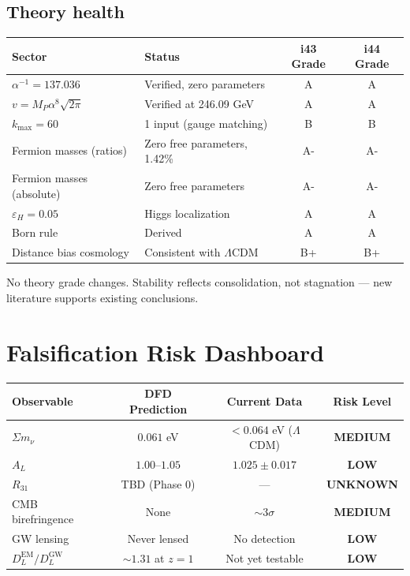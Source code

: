 \documentclass[11pt,a4paper]{article}
\begin{document}
\subsection{Theory health}

\begin{center}
\begin{tabular}{llcc}
\toprule
\textbf{Sector} & \textbf{Status} & \textbf{i43 Grade} & \textbf{i44 Grade} \\
\midrule
$\alpha^{-1} = 137.036$ & Verified, zero parameters & A & A \\
$v = M_P \alpha^8 \sqrt{2\pi}$ & Verified at 246.09 GeV & A & A \\
$k_{\max} = 60$ & 1 input (gauge matching) & B & B \\
Fermion masses (ratios) & Zero free parameters, 1.42\% & A- & A- \\
Fermion masses (absolute) & Zero free parameters & A- & A- \\
$\varepsilon_H = 0.05$ & Higgs localization & A & A \\
Born rule & Derived & A & A \\
Distance bias cosmology & Consistent with $\Lambda$CDM & B+ & B+ \\
\bottomrule
\end{tabular}
\end{center}

No theory grade changes. Stability reflects consolidation, not stagnation --- new literature supports existing conclusions.

\section{Falsification Risk Dashboard}

\begin{center}
\begin{tabular}{lccc}
\toprule
\textbf{Observable} & \textbf{DFD Prediction} & \textbf{Current Data} & \textbf{Risk Level} \\
\midrule
$\Sigma m_\nu$ & $0.061$ eV & $< 0.064$ eV ($\Lambda$CDM) & \textcolor{dfdyellow}{\textbf{MEDIUM}} \\
$A_L$ & $1.00$--$1.05$ & $1.025 \pm 0.017$ & \textcolor{dfdgreen}{\textbf{LOW}} \\
$R_{31}$ & TBD (Phase 0) & --- & \textcolor{dfdyellow}{\textbf{UNKNOWN}} \\
CMB birefringence & None & $\sim 3\sigma$ & \textcolor{dfdyellow}{\textbf{MEDIUM}} \\
GW lensing & Never lensed & No detection & \textcolor{dfdgreen}{\textbf{LOW}} \\
$D_L^{\text{EM}}/D_L^{\text{GW}}$ & $\sim 1.31$ at $z=1$ & Not yet testable & \textcolor{dfdgreen}{\textbf{LOW}} \\
\bottomrule
\end{tabular}
\end{center}
\end{document}
